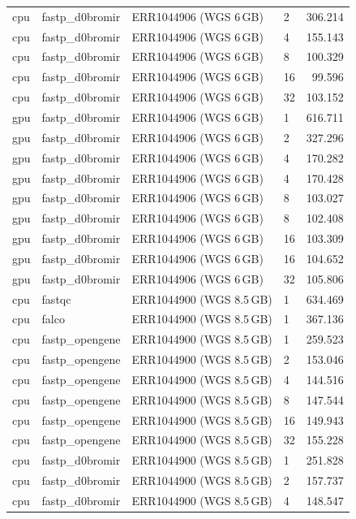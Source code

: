 \documentclass[a4paper,12pt]{article}
\begin{document}
\begin{longtable}{llllr}
  cpu & fastp\_d0bromir & ERR1044906 (WGS 6\,GB) & 2  & 306.214 \\
  cpu & fastp\_d0bromir & ERR1044906 (WGS 6\,GB) & 4  & 155.143 \\
  cpu & fastp\_d0bromir & ERR1044906 (WGS 6\,GB) & 8  & 100.329 \\
  cpu & fastp\_d0bromir & ERR1044906 (WGS 6\,GB) & 16 &  99.596 \\
  cpu & fastp\_d0bromir & ERR1044906 (WGS 6\,GB) & 32 & 103.152 \\
  gpu & fastp\_d0bromir & ERR1044906 (WGS 6\,GB) & 1  & 616.711 \\
  gpu & fastp\_d0bromir & ERR1044906 (WGS 6\,GB) & 2  & 327.296 \\
  gpu & fastp\_d0bromir & ERR1044906 (WGS 6\,GB) & 4  & 170.282 \\
  gpu & fastp\_d0bromir & ERR1044906 (WGS 6\,GB) & 4  & 170.428 \\
  gpu & fastp\_d0bromir & ERR1044906 (WGS 6\,GB) & 8  & 103.027 \\
  gpu & fastp\_d0bromir & ERR1044906 (WGS 6\,GB) & 8  & 102.408 \\
  gpu & fastp\_d0bromir & ERR1044906 (WGS 6\,GB) & 16 & 103.309 \\
  gpu & fastp\_d0bromir & ERR1044906 (WGS 6\,GB) & 16 & 104.652 \\
  gpu & fastp\_d0bromir & ERR1044906 (WGS 6\,GB) & 32 & 105.806 \\
  cpu & fastqc & ERR1044900 (WGS 8.5\,GB) & 1 & 634.469 \\
  cpu & falco  & ERR1044900 (WGS 8.5\,GB) & 1 & 367.136 \\
  cpu & fastp\_opengene & ERR1044900 (WGS 8.5\,GB) & 1  & 259.523 \\
  cpu & fastp\_opengene & ERR1044900 (WGS 8.5\,GB) & 2  & 153.046 \\
  cpu & fastp\_opengene & ERR1044900 (WGS 8.5\,GB) & 4  & 144.516 \\
  cpu & fastp\_opengene & ERR1044900 (WGS 8.5\,GB) & 8  & 147.544 \\
  cpu & fastp\_opengene & ERR1044900 (WGS 8.5\,GB) & 16 & 149.943 \\
  cpu & fastp\_opengene & ERR1044900 (WGS 8.5\,GB) & 32 & 155.228 \\
  cpu & fastp\_d0bromir & ERR1044900 (WGS 8.5\,GB) & 1  & 251.828 \\
  cpu & fastp\_d0bromir & ERR1044900 (WGS 8.5\,GB) & 2  & 157.737 \\
  cpu & fastp\_d0bromir & ERR1044900 (WGS 8.5\,GB) & 4  & 148.547 \\

\end{longtable}
\end{document}
